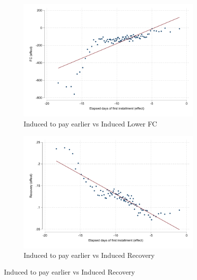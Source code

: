 



\begin{figure}[H]
    \caption{Relationship between treatment effects}
    \label{induced_to_pay_early}
    \begin{center}
    \begin{subfigure}{0.45\textwidth}
        \caption{\footnotesize{Induced to pay earlier vs Induced Lower FC}}
        \centering
        \includegraphics[width=\textwidth]{Figuras/binscatter_fc_days_pro_2.pdf}
    \end{subfigure}
        \begin{subfigure}{0.45\textwidth}
        \caption{\footnotesize{Induced to pay earlier vs Induced Recovery}}
        \centering
        \includegraphics[width=\textwidth]{Figuras/binscatter_def_days_pro_2.pdf}

\end{subfigure}
\end{center}
\end{figure}
